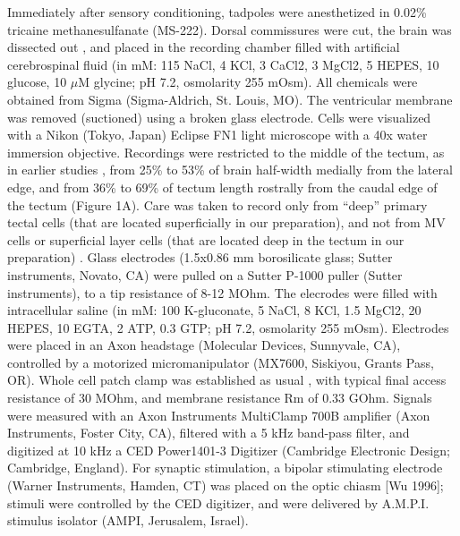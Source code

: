 \documentclass{article}
\begin{document}
Immediately after sensory conditioning, tadpoles were anesthetized in 0.02\% tricaine methanesulfanate (MS-222). Dorsal commissures were cut, the brain was dissected out \citep{aizenman2003,ciarleglio2015}, and placed in the recording chamber filled with artificial cerebrospinal fluid (in mM: 115 NaCl, 4 KCl, 3 CaCl2, 3 MgCl2, 5 HEPES, 10 glucose, 10 $\mu$M glycine; pH 7.2, osmolarity 255 mOsm). All chemicals were obtained from Sigma (Sigma-Aldrich, St. Louis, MO). The ventricular membrane was removed (suctioned) using a broken glass electrode. Cells were visualized with a Nikon (Tokyo, Japan) Eclipse FN1 light microscope with a 40x water immersion objective. Recordings were restricted to the middle of the tectum, as in earlier studies \citep{ciarleglio2015}, from 25\% to 53\% of brain half-width medially from the lateral edge, and from 36\% to 69\% of tectum length rostrally from the caudal edge of the tectum (Figure 1A). Care was taken to record only from “deep” primary tectal cells (that are located superficially in our preparation), and not from MV cells \citep{pratt2009} or superficial layer cells (that are located deep in the tectum in our preparation) \citep{liu2016}. Glass electrodes (1.5x0.86 mm borosilicate glass; Sutter instruments, Novato, CA) were pulled on a Sutter P-1000 puller (Sutter instruments), to a tip resistance of 8-12 MOhm. The elecrodes were filled with intracellular saline (in mM: 100 K-gluconate, 5 NaCl, 8 KCl, 1.5 MgCl2, 20 HEPES, 10 EGTA, 2 ATP, 0.3 GTP; pH 7.2, osmolarity 255 mOsm). Electrodes were placed in an Axon headstage (Molecular Devices, Sunnyvale, CA), controlled by a motorized micromanipulator (MX7600, Siskiyou, Grants Pass, OR). Whole cell patch clamp was established as usual \citep{ciarleglio2015}, with typical final access resistance of 30 MOhm, and membrane resistance Rm of 0.33 GOhm. Signals were measured with an Axon Instruments MultiClamp 700B amplifier (Axon Instruments, Foster City, CA), filtered with a 5 kHz band-pass filter, and digitized at 10 kHz a CED Power1401-3 Digitizer (Cambridge Electronic Design; Cambridge, England). For synaptic stimulation, a bipolar stimulating electrode (Warner Instruments, Hamden, CT) was placed on the optic chiasm [Wu 1996]; stimuli were controlled by the CED digitizer, and were delivered by A.M.P.I. stimulus isolator (AMPI, Jerusalem, Israel).
\end{document}
